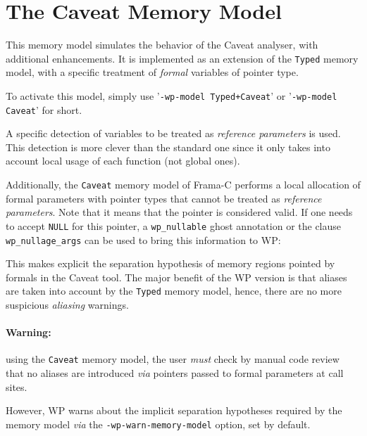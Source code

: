 \section{The Caveat Memory Model}
\label{CAVEAT}

This memory model simulates the behavior of the \textsf{Caveat}
analyser, with additional enhancements.  It is implemented as an
extension of the \texttt{Typed} memory model, with a specific
treatment of \textit{formal} variables of pointer type.

To activate
this model, simply use '\verb$-wp-model Typed+Caveat$' or
'\verb$-wp-model Caveat$' for short.

A specific detection of variables to be treated as \textit{reference
  parameters} is used.  This detection is more clever than the standard one
since it only takes into account local usage of each function (not
global ones).


Additionally, the \texttt{Caveat} memory model of \textsf{Frama-C}
performs a local allocation of formal parameters with pointer
types that cannot be treated as \textit{reference parameters}.
Note that it means that the pointer is considered valid. If one needs
to accept \texttt{NULL} for this pointer, a \texttt{wp\_nullable} ghost
annotation or the clause \texttt{wp\_nullage\_args} can be used to bring
this information to WP:


This makes explicit the separation hypothesis of memory regions
pointed by formals in the \textsf{Caveat} tool. The major benefit of
the \textsf{WP} version is that aliases are taken into account by the
\texttt{Typed} memory model, hence, there are no more suspicious
\textit{aliasing} warnings.

\paragraph{Warning:} using the \texttt{Caveat} memory model,
the user \emph{must} check by manual code review that no aliases are
introduced \emph{via} pointers passed to formal parameters at call sites.

However, \textsf{WP} warns about the implicit separation hypotheses required by
the memory model \textit{via} the \texttt{-wp-warn-memory-model} option, set
by default.
